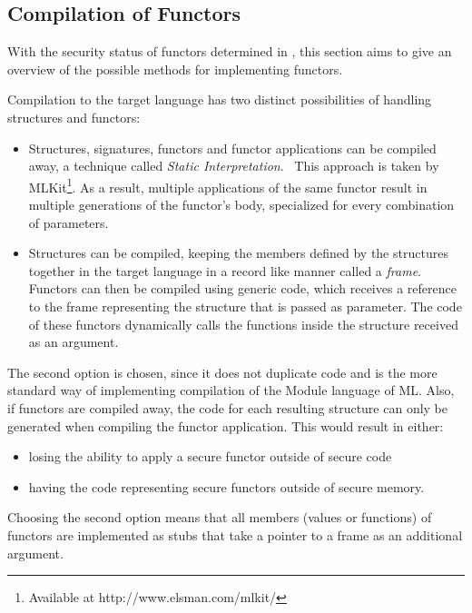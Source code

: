 \subsection{Compilation of Functors}
\label{sec:FunctorCompilation}
With the security status of functors determined in , %
this section aims to give an overview of the possible methods for implementing functors.

Compilation to the target language has two distinct possibilities of handling structures and functors:
\begin{itemize}
    \item Structures, signatures, functors and functor applications can be compiled away, a technique called \emph{Static Interpretation}.~\cite{Elsman}
    This approach is taken by MLKit\footnote{Available at http://www.elsman.com/mlkit/}.
    As a result, multiple applications of the same functor result in multiple generations of the functor's body, specialized for every combination of parameters.
    \item Structures can be compiled, keeping the members defined by the structures together in the target language in a record like manner called a \emph{frame}.
    Functors can then be compiled using generic code, which receives a reference to the frame representing the structure that is passed as parameter.
    The code of these functors dynamically calls the functions inside the structure received as an argument.
\end{itemize}

The second option is chosen, since it does not duplicate code and is the more standard way of implementing compilation of the Module language of ML.
Also, if functors are compiled away, the code for each resulting structure can only be generated when compiling the functor application.
This would result in either:
\begin{itemize}
\item losing the ability to apply a secure functor outside of secure code
\item having the code representing secure functors outside of secure memory.
\end{itemize}

\smallskip
Choosing the second option means that all members (values or functions) of functors are implemented as stubs that take a pointer to a frame as an additional argument.

